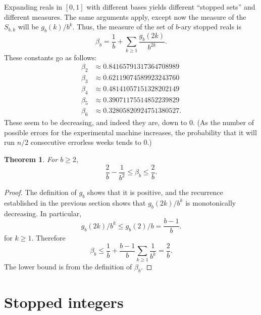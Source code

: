 \documentclass[12pt]{amsart}
\newtheorem{theorem}{Theorem}
\theoremstyle{definition}
\begin{document}
Expanding reals in $[0, 1]$ with different bases yields different ``stopped
sets'' and different measures. The same arguments apply, except now the measure
of the $S_{b,k}$ will be $g_b(k) / b^k$. Thus, the measure of the set of $b$-ary
stopped reals is
\begin{equation*}
    \beta_b = \frac{1}{b} + \sum_{k \geq 1} \frac{g_b(2k)}{b^{2k}}.
\end{equation*}
These constants go as follows:
\begin{align*}
    \beta_2 &\approx 0.84165791317364708989 \\
    \beta_3 &\approx 0.62119074589923243760 \\
    \beta_4 &\approx 0.48141057151328202149 \\
    \beta_5 &\approx 0.39071175514852239829 \\
    \beta_6 &\approx 0.32805820924751380527.
\end{align*}
These seem to be decreasing, and indeed they are, down to 0.
(As the number of possible errors for the experimental machine increases, the probability
that it will run $n/2$ consecutive errorless weeks tends to 0.)
\begin{theorem}
    For $b \geq 2$,
    \begin{equation*}
        \frac{2}{b} - \frac{1}{b^2} \leq \beta_b \leq \frac{2}{b}.
    \end{equation*}
\end{theorem}

\begin{proof}
    The definition of $g_b$ shows that it is positive, and the recurrence
    established in the previous section shows that $g_b(2k) / b^k$ is
    monotonically decreasing. In particular,
    \begin{equation*}
        g_b(2k) / b^k \leq g_b(2) / b = \frac{b - 1}{b}.
    \end{equation*}
    for $k \geq 1$. Therefore
    \begin{equation*}
        \beta_b \leq \frac{1}{b} + \frac{b - 1}{b} \sum_{k \geq 1} \frac{1}{b^k}
        = \frac{2}{b}.
    \end{equation*}
    The lower bound is from the definition of $\beta_b$.
\end{proof}

\section{Stopped integers}
\label{sec:integers}
\end{document}
